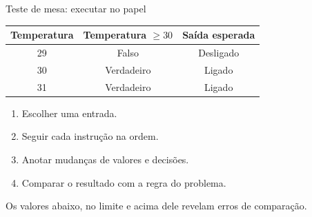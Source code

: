 \begin{frame}[t]{Teste de mesa: executar no papel}
\begin{center}\begin{tabular}{ccc}\toprule
Temperatura & Temperatura $\geq 30$ & Saída esperada\\\midrule
29 & Falso & Desligado\\
30 & Verdadeiro & Ligado\\
31 & Verdadeiro & Ligado\\\bottomrule
\end{tabular}\end{center}
\begin{enumerate}
\item Escolher uma entrada.
\item Seguir cada instrução na ordem.
\item Anotar mudanças de valores e decisões.
\item Comparar o resultado com a regra do problema.
\end{enumerate}
\small Os valores abaixo, no limite e acima dele revelam erros de comparação.
\end{frame}
